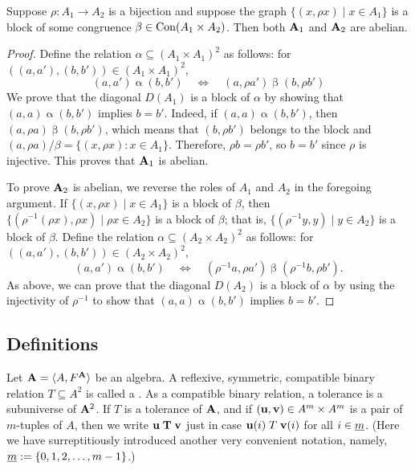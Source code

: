 \begin{lem}
Suppose $\rho\colon A_1 \to A_2$ is a bijection and suppose the graph
$\{(x, \rho x) \mid x \in A_1\}$ is a block of some congruence
$\beta \in \operatorname{Con} (A_1 \times A_2)$.  Then both $\mathbf{A}_1$ and $\mathbf{A}_2$ are abelian.
\end{lem}
\begin{proof}
  Define the relation $\alpha\subseteq (A_1\times A_1)^2$ as follows: for
  $((a,a'), (b,b')) \in (A_1\times A_1)^2$,
  \[
  (a,a')\mathrel{\alpha} (b,b')
  \quad \iff \quad
  (a, \rho a') \mathrel{\beta} (b, \rho b')
  \]
  We prove that the diagonal $D(A_1)$ is a block of $\alpha$ by showing that
  $(a, a) \mathrel{\alpha} (b,b')$ implies $b = b'$.
  Indeed, if $(a, a) \mathrel{\alpha} (b,b')$, then
  $(a, \rho a) \mathrel{\beta} (b, \rho b')$, which means that
  $(b, \rho b')$ belongs to the block and
  $(a, \rho a)/\beta = \{(x, \rho x): x\in A_1\}$.  Therefore,
  $\rho b  = \rho b'$, so $b = b'$ since $\rho$ is injective.
  This proves that $\mathbf{A}_1$ is abelian.

  To prove $\mathbf{A}_2$ is abelian, we reverse the roles of $A_1$ and $A_2$ in the
  foregoing argument.  
  If $\{(x, \rho x) \mid x \in A_1\}$ is a block of $\beta$,
  then 
  $\{(\rho^{-1}(\rho x), \rho x) \mid \rho x \in A_2\}$ is a block of $\beta$; that
  is, $\{(\rho^{-1} y, y) \mid y \in A_2\}$ is a block of $\beta$.  Define 
  the relation $\alpha\subseteq (A_2\times A_2)^2$ as follows: for
  $((a,a'), (b,b')) \in (A_2\times A_2)^2$,
  \[
  (a,a')\mathrel{\alpha} (b,b')
  \quad \iff \quad
  (\rho^{-1}a, \rho a') \mathrel{\beta} (\rho^{-1}b, \rho b').
  \]
  As above, we can prove that the diagonal $D(A_2)$ is a block of $\alpha$
  by using the injectivity of $\rho^{-1}$ to show that $(a, a) \mathrel{\alpha}
  (b,b')$
  implies $b = b'$.
\end{proof}













\subsection{Definitions} %
Let $\mathbf{A} = \langle A, F^{\mathbf{A}}\rangle$ be an algebra.
A reflexive, symmetric, compatible binary relation $T\subseteq A^2$ is called a
.  
As a compatible binary relation, a tolerance is a subuniverse of $\mathbf{A}^2$.
If $T$ is a tolerance of $\mathbf{A}$, and if $(\mathbf{u}, \mathbf{v}) \in A^m\times A^m$
is a pair of $m$-tuples of $A$, then we write 
$\mathbf{u} \mathrel{\mathbf{T}} \mathbf{v}$ just in case $\mathbf{u}(i) \mathrel{T} \mathbf{v}(i)$ for all $i\in \underline{m}$. 
(Here we have surreptitiously introduced another very convenient notation, namely,
$\underline{m} := \{0, 1, 2, \dots, m-1\}$.)

